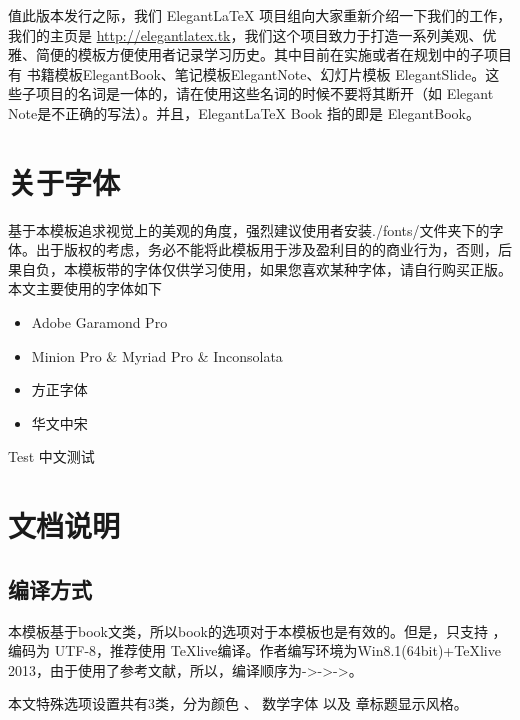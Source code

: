 \documentclass[color=green,mathpazo,titlestyle=hang,11pt]{elegantbook}
\begin{document}
值此版本发行之际，我们 Elegant\LaTeX{} 项目组向大家重新介绍一下我们的工作，我们的主页是 \href{http://elegantlatex.tk}{http://elegantlatex.tk}，我们这个项目致力于打造一系列美观、优雅、简便的模板方便使用者记录学习历史。其中目前在实施或者在规划中的子项目有 书籍模板ElegantBook、笔记模板ElegantNote、幻灯片模板 ElegantSlide。这些子项目的名词是一体的，请在使用这些名词的时候不要将其断开（如 Elegant Note是不正确的写法）。并且，Elegant\LaTeX{}  Book 指的即是 ElegantBook。

\section{关于字体}

基于本模板追求视觉上的美观的角度，强烈建议使用者安装./fonts/文件夹下的字体。出于版权的考虑，务必不能将此模板用于涉及盈利目的的商业行为，否则，后果自负，本模板带的字体仅供学习使用，如果您喜欢某种字体，请自行购买正版。本文主要使用的字体如下
\begin{itemize}
\itemsep=3pt
\parskip=0pt
\item Adobe Garamond Pro
\item Minion Pro \& Myriad Pro  \& Inconsolata
\item 方正字体
\item 华文中宋
\end{itemize}

\begin{note}
Test 中文测试

\end{note}
\section{文档说明}
\subsection{编译方式}
本模板基于book文类，所以book的选项对于本模板也是有效的。但是，只支持 \XeLaTeX{}，编码为 UTF-8，推荐使用 \TeX{}live编译。作者编写环境为Win8.1(64bit)+\TeX{}live 2013，由于使用了参考文献，所以，编译顺序为\XeLaTeX->\BibTeX->\XeLaTeX->\XeLaTeX。

本文特殊选项设置共有3类，分为{\color{main}颜色} 、{\color{main} 数学字体 }以及{\color{main} 章标题显示风格}。
\end{document}
